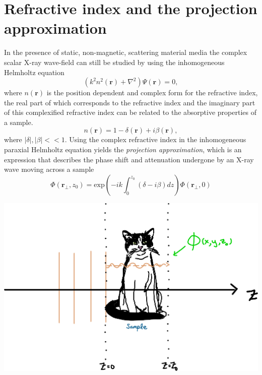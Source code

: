 \documentclass[10pt, a4paper, singlespacing]{report}
\newenvironment{Figure}
    {\par\medskip\noindent\minipage{\linewidth}}
    {\endminipage\par\medskip}
\begin{document}
\section{Refractive index and the projection approximation}\label{PA}
In the presence of static, non-magnetic, scattering material media the complex scalar X-ray wave-field can still be studied by using the inhomogeneous Helmholtz equation 
\begin{equation}\label{eq:10}
\left ( k^2 n^2 (\mathbf{r}) + \nabla^{2}  \right )\Psi(\mathbf{r}) = 0,
\end{equation}
where $n(\mathbf{r})$ is the position dependent and complex form for the refractive index, the real part of which corresponds to the refractive index and the imaginary part of this complexified refractive index can be related to the absorptive properties of a sample\cite{PagsTutes}.
\begin{equation}\label{eq:11}
n(\mathbf{r}) = 1 - \delta(\mathbf{r}) + i \beta(\mathbf{r}),
\end{equation}
where $|\delta|, |\beta| << 1$. Using the complex refractive index in the inhomogeneous paraxial Helmholtz equation yields the \textit{projection approximation}, which is an expression that describes the phase shift and attenuation undergone by an X-ray wave moving across a sample
\begin{equation}\label{eq:12}
\Phi(\mathbf{r}_{\perp}, z_0) = \mathrm{exp} \left ( -ik \int_{0}^{z_0}(\delta - i\beta)dz\right ) \Phi(\mathbf{r}_{\perp}, 0)
\end{equation}
\begin{Figure}
\centering
\includegraphics[width=0.6\linewidth]{projection_approximation.pdf}
\label{fig:1.2}
\end{Figure}
\end{document}

